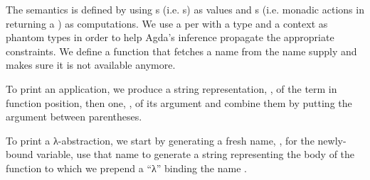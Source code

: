 The  semantics is defined by using s (i.e. s)
as values and s (i.e. monadic actions in  returning a )
as computations. We use a per with a type and a context as phantom types
in order to help Agda's inference propagate the appropriate constraints. We define
a function  that fetches a name from the name supply and makes sure it is
not available anymore.

\begin{center}
\begin{minipage}{0.6\textwidth}
\end{minipage}

\begin{minipage}{0.45\textwidth}
\end{minipage}
\begin{minipage}{0.45\textwidth}
\end{minipage}
\end{center}


To print an application, we produce a string representation, , of the term in
function position, then one, , of its argument and combine them by putting the
argument between parentheses.

\begin{agdasnippet}
\end{agdasnippet}

To print a λ-abstraction, we start by generating a fresh name, , for the
newly-bound variable, use that name to generate a string  representing the
body of the function to which we prepend a ``λ'' binding the name .

